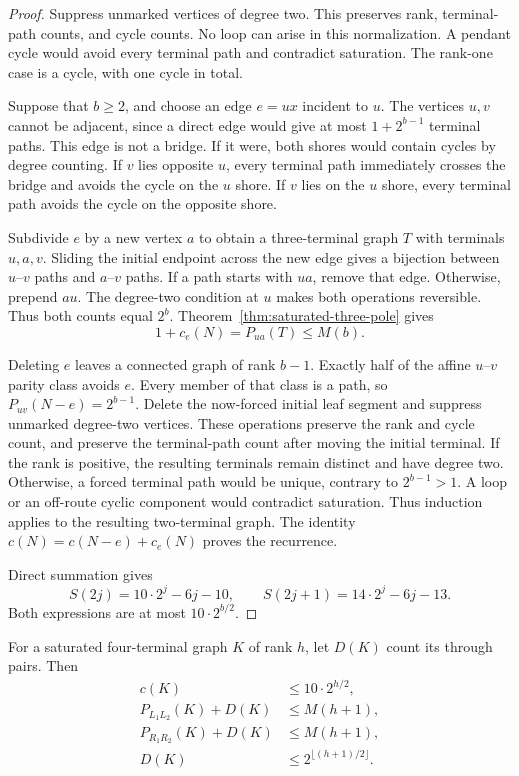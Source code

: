 \begin{proof}
Suppress unmarked vertices of degree two.
This preserves rank, terminal-path counts, and cycle counts.
No loop can arise in this normalization.
A pendant cycle would avoid every terminal path and contradict saturation.
The rank-one case is a cycle, with one cycle in total.

Suppose that $b\ge2$, and choose an edge $e=ux$ incident to $u$.
The vertices $u,v$ cannot be adjacent, since a direct edge would give at most $1+2^{b-1}$ terminal paths.
This edge is not a bridge.
If it were, both shores would contain cycles by degree counting.
If $v$ lies opposite $u$, every terminal path immediately crosses the bridge and avoids the cycle on the $u$ shore.
If $v$ lies on the $u$ shore, every terminal path avoids the cycle on the opposite shore.

Subdivide $e$ by a new vertex $a$ to obtain a three-terminal graph $T$ with terminals $u,a,v$.
Sliding the initial endpoint across the new edge gives a bijection between
$u$--$v$ paths and $a$--$v$ paths.
If a path starts with $ua$, remove that edge.
Otherwise, prepend $au$.
The degree-two condition at $u$ makes both operations reversible.
Thus both counts equal $2^b$.
Theorem~\ref{thm:saturated-three-pole} gives
\[
 1+c_e(N)=P_{ua}(T)\le M(b).
\]

Deleting $e$ leaves a connected graph of rank $b-1$.
Exactly half of the affine $u$--$v$ parity class avoids $e$.
Every member of that class is a path, so
$P_{uv}(N-e)=2^{b-1}$.
Delete the now-forced initial leaf segment and suppress unmarked degree-two vertices.
These operations preserve the rank and cycle count, and preserve the terminal-path count after moving the initial terminal.
If the rank is positive, the resulting terminals remain distinct and have degree two.
Otherwise, a forced terminal path would be unique, contrary to $2^{b-1}>1$.
A loop or an off-route cyclic component would contradict saturation.
Thus induction applies to the resulting two-terminal graph.
The identity $c(N)=c(N-e)+c_e(N)$ proves the recurrence.

Direct summation gives
\[
 S(2j)=10\cdot2^j-6j-10,
 \qquad
 S(2j+1)=14\cdot2^j-6j-13.
\]
Both expressions are at most $10\cdot2^{b/2}$.
\end{proof}

\begin{corollary}\label{cor:saturated-four-pole-cap}
For a saturated four-terminal graph $K$ of rank $h$, let $D(K)$ count its through pairs.
Then
\[
 \begin{split}
 c(K)&\le10\cdot2^{h/2},\\
 P_{L_1L_2}(K)+D(K)&\le M(h+1),\\
 P_{R_1R_2}(K)+D(K)&\le M(h+1),\\
 D(K)&\le2^{\lfloor(h+1)/2\rfloor}.
 \end{split}
\]
\end{corollary}

